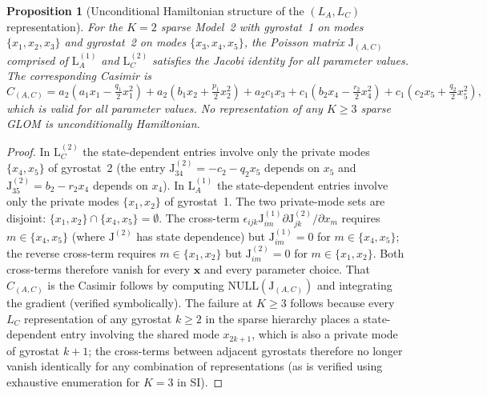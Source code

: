 \documentclass[10pt,a4paper]{amsart}
\newtheorem{proposition}{Proposition}
\begin{document}
\begin{proposition}[Unconditional Hamiltonian structure of the $(L_{A},L_{C})$
representation]\label{prop:AC_uncond} For the $K=2$ sparse Model~2
with gyrostat~1 on modes $\{x_{1},x_{2},x_{3}\}$ and gyrostat~2
on modes $\{x_{3},x_{4},x_{5}\}$, the Poisson matrix $\mathrm{J}_{(A,C)}$
comprised of $\mathrm{L}_{A}^{(1)}$ and $\mathrm{L}_{C}^{(2)}$ satisfies
the Jacobi identity for all parameter values. The corresponding Casimir
is 
\begin{equation}
C_{(A,C)}=a_{2}\!\left(a_{1}x_{1}-\tfrac{q_{1}}{2}x_{1}^{2}\right)+a_{2}\!\left(b_{1}x_{2}+\tfrac{p_{1}}{2}x_{2}^{2}\right)+a_{2}c_{1}x_{3}+c_{1}\!\left(b_{2}x_{4}-\tfrac{r_{2}}{2}x_{4}^{2}\right)+c_{1}\!\left(c_{2}x_{5}+\tfrac{q_{2}}{2}x_{5}^{2}\right),\label{eq:cas_AC}
\end{equation}
which is valid for all parameter values. No representation of any
$K\geq3$ sparse GLOM is unconditionally Hamiltonian.\end{proposition}

\begin{proof}
In $\mathrm{L}_{C}^{(2)}$ the state-dependent entries involve only
the private modes $\{x_{4},x_{5}\}$ of gyrostat~2 (the entry $\mathrm{J}_{34}^{(2)}=-c_{2}-q_{2}x_{5}$
depends on $x_{5}$ and $\mathrm{J}_{35}^{(2)}=b_{2}-r_{2}x_{4}$
depends on $x_{4}$). In $\mathrm{L}_{A}^{(1)}$ the state-dependent
entries involve only the private modes $\{x_{1},x_{2}\}$ of gyrostat~1.
The two private-mode sets are disjoint: $\{x_{1},x_{2}\}\cap\{x_{4},x_{5}\}=\emptyset$.
The cross-term $\epsilon_{ijk}\mathrm{J}_{im}^{(1)}\partial\mathrm{J}_{jk}^{(2)}/\partial x_{m}$
requires $m\in\{x_{4},x_{5}\}$ (where $\mathrm{J}^{(2)}$ has state
dependence) but $\mathrm{J}_{im}^{(1)}=0$ for $m\in\{x_{4},x_{5}\}$;
the reverse cross-term requires $m\in\{x_{1},x_{2}\}$ but $\mathrm{J}_{im}^{(2)}=0$
for $m\in\{x_{1},x_{2}\}$. Both cross-terms therefore vanish for
every $\mathbf{x}$ and every parameter choice. That $C_{(A,C)}$
is the Casimir follows by computing $\mathrm{NULL}(\mathrm{J}_{(A,C)})$
and integrating the gradient (verified symbolically). The failure
at $K\geq3$ follows because every $L_{C}$ representation of any
gyrostat $k\geq2$ in the sparse hierarchy places a state-dependent
entry involving the shared mode $x_{2k+1}$, which is also a private
mode of gyrostat $k+1$; the cross-terms between adjacent gyrostats
therefore no longer vanish identically for any combination of representations
(as is verified using exhaustive enumeration for $K=3$ in SI).
\end{proof}
\end{document}
